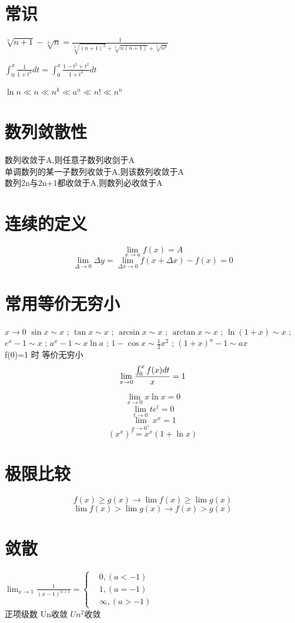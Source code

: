 \documentclass[UTF8]{ctexart}
\begin{document}
\section{常识}
$\sqrt[3]{n+1}-\sqrt[3]{n}=\frac{1}{\sqrt[3]{{(n+1)}^2}+\sqrt[3]{n(n+1)}+\sqrt[3]{n^2}}$

$\int_0^x\frac{1}{1+t^3}dt=\int_0^x\frac{1-t^2+t^2}{1+t^3}dt$

$\ln n \ll n \ll n^k \ll a^n \ll n! \ll n^n$


\section{数列敛散性}
数列收敛于A,则任意子数列收剑于A   \\
单调数列的某一子数列收敛于A,则该数列收敛于A \\
数列{2n}与{2n+1}都收敛于A,则数列必收敛于A

\section{连续的定义}
$$ \lim_{x\rightarrow a}f(x)=A$$
$$ \lim_{\Delta\rightarrow0}\Delta y=\lim_{\Delta x \rightarrow 0 } f(x+ \Delta x) - f(x)=0$$

\section{常用等价无穷小}
 $ x \rightarrow 0$
$ \sin x \sim x$ ; $ \tan x \sim x$ ; $ \arcsin x \sim x$ ; $ \arctan x \sim x$ ; $ \ln({1+x}) \sim x $ ; $ e^x -1 \sim x$ ; $ a^x -1 \sim x \ln a $ ; $ 1-\cos x \sim \frac{1}{2} x^2 $ ; $ {(1+x)}^a -1 \sim ax$ \\

f(0)=1 时 等价无穷小 \\
$$ \lim_{x \rightarrow 0 } {{\int_0^x f(x)dt} \over {x}} =1$$

$$ \lim_{x \rightarrow 0} x \ln x =0$$
$$\lim_{t \rightarrow 0} t e^t =0 $$
$$\lim _{x \rightarrow 0^+} x^x =1$$
$$(x^x)'=x^x(1+ \ln x)$$

\section{极限比较}
$$ f(x) \geq g(x) \rightarrow \lim f(x) \geq \lim g(x) $$
$$ \lim f(x) > \lim g(x) \rightarrow f(x) > g(x) $$
\section{敛散}
$ \lim_{x \rightarrow 1} \frac{1}{(x-1)^{α+1}}=
  \begin{cases}
  &0 , (a<-1) \\
  &1 , (a=-1) \\
  &\infty ,(a>-1)
\end{cases}$ \\
正项级数 Un收敛 $Un^2$收敛
\end{document}
